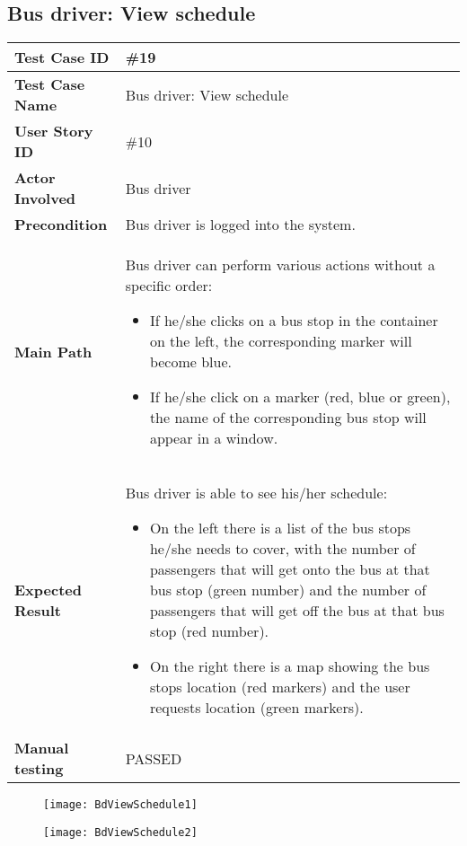 \subsection{Bus driver: View schedule}
\begin{center}
	\begin{tabular} { | m{3.5cm} | m{9.5cm} | }
		\hline
		\textbf{Test Case ID} & \#19\\
		\hline
		\textbf{Test Case Name} & Bus driver: View schedule\\
		\hline
		\textbf{User Story ID} & \#10 \\
		\hline
		\textbf{Actor Involved} & Bus driver\\
		\hline
		\textbf{Precondition} & Bus driver is logged into the system.\\
		\hline
		\textbf{Main Path} & 
		Bus driver can perform various actions without a specific order:
		\begin{itemize}
			\item If he/she clicks on a bus stop in the container on the left, the corresponding marker will become blue.
			\item If he/she click on a marker (red, blue or green), the name of the corresponding bus stop will appear in a window.
		\end{itemize}\\
		\hline
		\textbf{Expected Result} & Bus driver is able to see his/her schedule: 
		\begin{itemize}
			\item On the left there is a list of the bus stops he/she needs to cover, with the number of passengers that will get onto the bus at that bus stop (green number) and the number of passengers that will get off the bus at that bus stop (red number).
			\item On the right there is a map showing the bus stops location (red markers) and the user requests location (green markers).
		\end{itemize}\\
		\hline
	\textbf{Manual testing} & PASSED\\
	\hline
\end{tabular}
\end{center}
\begin{figure}[H]
\centering
\texttt{[image: BdViewSchedule1]}
\end{figure}
\begin{figure}[H]
\centering
\texttt{[image: BdViewSchedule2]}
\end{figure}
